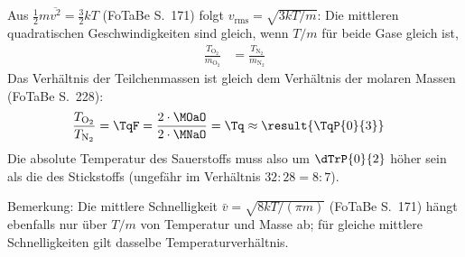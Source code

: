 Aus $\frac{1}{2}m\overline{v^2} = \frac{3}{2}kT$ (FoTaBe S.~171) folgt $v_\text{rms} = \sqrt{3kT/m}$: Die mittleren quadratischen Geschwindigkeiten sind gleich, wenn $T/m$ für beide Gase gleich ist,
\begin{align}
 \frac{T_{\mathrm{O_2}}}{m_{\mathrm{O_2}}} &= \frac{T_{\mathrm{N_2}}}{m_{\mathrm{N_2}}}
\end{align}
Das Verhältnis der Teilchenmassen ist gleich dem Verhältnis der molaren Massen (FoTaBe S.~228):
\begin{align}
 \frac{T_{\mathrm{O_2}}}{T_{\mathrm{N_2}}} &= \TqF = \frac{2\cdot\MOaO}{2\cdot\MNaO} = \Tq \approx \result{\TqP{0}{3}}
\end{align}
Die absolute Temperatur des Sauerstoffs muss also um $\dTrP{0}{2}$ höher sein als die des Stickstoffs (ungefähr im Verhältnis $32:28 = 8:7$).

Bemerkung: Die mittlere Schnelligkeit $\bar v = \sqrt{8kT/(\pi m)}$ (FoTaBe S.~171) hängt ebenfalls nur über $T/m$ von Temperatur und Masse ab; für gleiche mittlere Schnelligkeiten gilt dasselbe Temperaturverhältnis.
